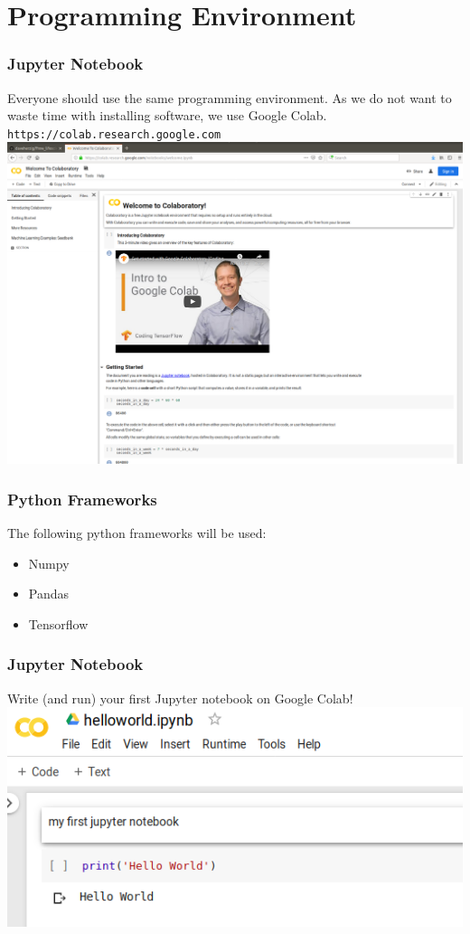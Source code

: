 \section{Programming Environment}

\begin{frame}[fragile]
  \frametitle{Jupyter Notebook}
  Everyone should use the same programming environment. As we do not want to waste time with
  installing software, we use Google Colab.\\
  \verb|https://colab.research.google.com|\\
  \vspace{3mm}
  \includegraphics[scale=0.1]{img/jupyter_notebook}
\end{frame}


\begin{frame}[fragile]
  \frametitle{Python Frameworks}
  The following python frameworks will be used:
  \begin{itemize}
  \item Numpy
  \item Pandas
  \item Tensorflow
  \end{itemize}
\end{frame}

\begin{frame}[fragile]
  \frametitle{Jupyter Notebook}
  \begin{exercise}
  Write (and run) your first Jupyter notebook on Google Colab!
  \includegraphics[scale=0.5]{img/jupyter_notebook_exercise}
  \end{exercise}
\end{frame}
